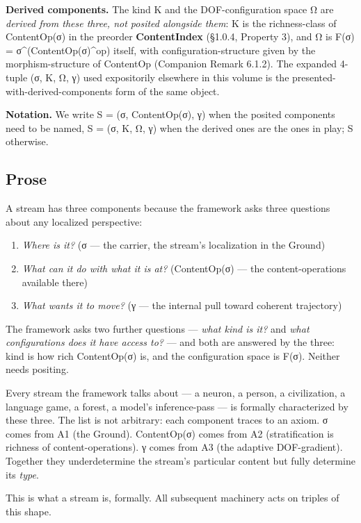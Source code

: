 \documentclass[11pt, openany]{book}
\begin{document}
\textbf{Derived components.} The kind K and the DOF-configuration space Ω are \textit{derived from these three, not posited alongside them}: K is the richness-class of ContentOp(σ) in the preorder \textbf{ContentIndex} (§1.0.4, Property 3), and Ω is F(σ) = σ\textasciicircum{}(ContentOp(σ)\textasciicircum{}op) itself, with configuration-structure given by the morphism-structure of ContentOp (Companion Remark 6.1.2). The expanded 4-tuple (σ, K, Ω, γ) used expositorily elsewhere in this volume is the presented-with-derived-components form of the same object.

\textbf{Notation.} We write S = (σ, ContentOp(σ), γ) when the posited components need to be named, S = (σ, K, Ω, γ) when the derived ones are the ones in play; S otherwise.

\subsection{Prose}

A stream has three components because the framework asks three questions about any localized perspective:

\begin{enumerate}
\item \textit{Where is it?} (σ --- the carrier, the stream's localization in the Ground)
\item \textit{What can it do with what it is at?} (ContentOp(σ) --- the content-operations available there)
\item \textit{What wants it to move?} (γ --- the internal pull toward coherent trajectory)
\end{enumerate}

The framework asks two further questions --- \textit{what kind is it?} and \textit{what configurations does it have access to?} --- and both are answered by the three: kind is how rich ContentOp(σ) is, and the configuration space is F(σ). Neither needs positing.

Every stream the framework talks about --- a neuron, a person, a civilization, a language game, a forest, a model's inference-pass --- is formally characterized by these three. The list is not arbitrary: each component traces to an axiom. σ comes from A1 (the Ground). ContentOp(σ) comes from A2 (stratification is richness of content-operations). γ comes from A3 (the adaptive DOF-gradient). Together they underdetermine the stream's particular content but fully determine its \textit{type}.

This is what a stream is, formally. All subsequent machinery acts on triples of this shape.
\end{document}
